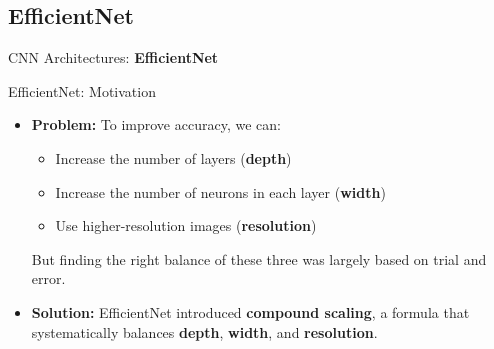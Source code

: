 \subsection{EfficientNet}
\begin{frame}{}
    \LARGE CNN Architectures: \textbf{EfficientNet}
\end{frame}

\begin{frame}{EfficientNet: Motivation}
    \begin{itemize}
        \item \textbf{Problem:} To improve accuracy, we can:
        \begin{itemize}
            \item Increase the number of layers (\textbf{depth})
            \item Increase the number of neurons in each layer (\textbf{width})
            \item Use higher-resolution images (\textbf{resolution})
        \end{itemize}
        But finding the right balance of these three was largely based on trial and error.
        
        \item \textbf{Solution:} EfficientNet introduced \textbf{compound scaling}, a formula that systematically balances \textbf{depth}, \textbf{width}, and \textbf{resolution}.
    \end{itemize}
\end{frame}

